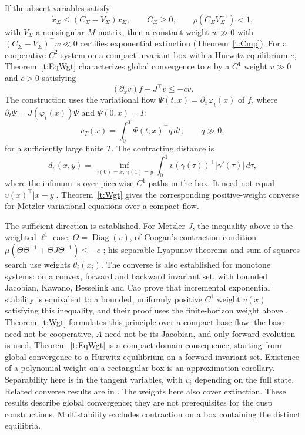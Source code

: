 \begin{enumerate}
If the absent variables satisfy
\[
 \dot x_\Sigma\le(C_\Sigma-V_\Sigma)x_\Sigma,\qquad
 C_\Sigma\ge0,\qquad \rho(C_\Sigma V_\Sigma^{-1})<1,
\]
with $V_\Sigma$ a nonsingular $M$-matrix, then a constant weight
$w\gg0$ with $(C_\Sigma-V_\Sigma)^\top w\ll0$ certifies exponential
extinction (Theorem~\ref{t:Cmp}).
For a cooperative $C^2$ system on a compact invariant box with a
Hurwitz equilibrium $e$, Theorem~\ref{t:EqWgt} characterizes global
convergence to $e$ by a $C^1$ weight $v\gg0$ and $c>0$ satisfying
\[
 (\partial_xv)f+J^\top v\le-cv.
\]
The construction uses the variational flow
$\Psi(t,x)=\partial_x\varphi_t(x)$ of $f$, where
$\partial_t\Psi=J(\varphi_t(x))\Psi$ and $\Psi(0,x)=I$:
\[
 v_T(x)=\int_0^T\Psi(t,x)^\top q\,dt,\qquad q\gg0,
\]
for a sufficiently large finite $T$.
The contracting distance is
\[
 d_v(x,y)=\inf_{\gamma(0)=x,\ \gamma(1)=y}
 \int_0^1 v(\gamma(\tau))^\top|\gamma'(\tau)|\,d\tau,
\]
where the infimum is over piecewise $C^1$ paths in the box.
It need not equal $v(x)^\top|x-y|$.
Theorem~\ref{t:Wgt} gives the corresponding positive-weight converse
for Metzler variational equations over a compact flow.

The sufficient direction is established. For Metzler $J$, the inequality above is the
weighted $\ell^1$ case, $\Theta=\operatorname{Diag}(v)$, of Coogan's contraction condition
$\mu(\dot\Theta\Theta^{-1}+\Theta J\Theta^{-1})\le-c$ \cite{Coogan2019}; his separable Lyapunov
theorems and sum-of-squares search use weights $\theta_i(x_i)$.
The converse is also established for monotone systems: on a convex, forward and backward
invariant set, with bounded Jacobian, Kawano, Besselink and Cao
\cite[Theorem~4.3, Corollary~4.8]{KawanoBesselinkCao2020} prove that incremental exponential
stability is equivalent to a bounded, uniformly positive $C^1$ weight $v(x)$ satisfying this
inequality, and their proof uses the finite-horizon weight above
\cite[Appendix~B, (61)]{KawanoBesselinkCao2020}.
Theorem~\ref{t:Wgt} formulates this principle over a compact base flow: the base need not be
cooperative, $A$ need not be its Jacobian, and only forward evolution is used.
Theorem~\ref{t:EqWgt} is a compact-domain consequence, starting from global convergence to a
Hurwitz equilibrium on a forward invariant set. Existence of a polynomial weight on a
rectangular box is an approximation corollary. Separability here is in the tangent variables,
with $v_i$ depending on the full state.
Related converse results are in
\cite{LohmillerSlotine1998,ForniSepulchre2014,Giesl2015}.
The weights here also cover extinction. These results describe global convergence;
they are not prerequisites for the cusp constructions. Multistability
excludes contraction on a box containing the distinct equilibria.


\end{enumerate}
